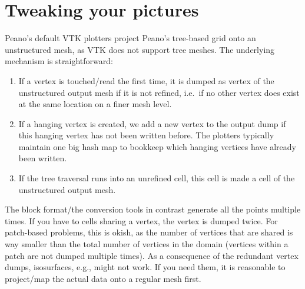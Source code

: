     


  
  
  
  

    
\section{Tweaking your pictures}
\label{section:postprocessing:tweaking-pictures}


Peano's default VTK plotters project Peano's tree-based grid onto an
unstructured mesh, as VTK does not support tree meshes.
The underlying mechanism is straightforward:

\begin{enumerate}
  \item If a vertex is touched/read the first time, it is dumped as vertex of
  the unstructured output mesh if it is not refined, i.e.~if no other vertex
  does exist at the same location on a finer mesh level.
  \item If a hanging vertex is created, we add a new vertex to the output dump
  if this hanging vertex has not been written before. The plotters typically
  maintain one big hash map to bookkeep which hanging vertices have already been
  written.
  \item If the tree traversal runs into an unrefined cell, this cell is made a
  cell of the unstructured output mesh.
\end{enumerate}


The block format/the conversion tools in contrast generate all the points
multiple times.
If you have to cells sharing a vertex, the vertex is dumped twice.
For patch-based problems, this is okish, as the number of vertices that are
shared is way smaller than the total number of vertices in the domain (vertices
within a patch are not dumped multiple times).
As a consequence of the redundant vertex dumps, isosurfaces, e.g., might not
work.
If you need them, it is reasonable to project/map the actual data onto a regular
mesh first.


